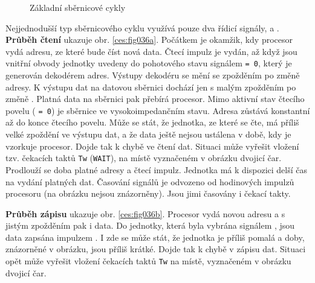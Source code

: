       \begin{figure}[ht!] 
        \centering  
        \hspace{1em}
        \caption{Základní sběrnicové cykly}
        \label{ces:fig036}
      \end{figure}
    
      Nejjednodušší typ sběrnicového cyklu využívá pouze dva řídicí signály,
       a . \textbf{Průběh čtení} ukazuje obr.
      \ref{ces:fig036a}. Počátkem je okamžik, kdy procesor vydá adresu, ze které bude číst nová
      data. Čtecí impulz  je vydán, až když jsou vnitřní obvody jednotky
      uvedeny do pohotového stavu signálem   \texttt{= 0}, který je
      generován dekodérem adres. Výstupy dekodéru se mění se zpožděním po změně adresy. K výstupu
      dat na datovou sběrnici dochází jen s malým zpožděním po změně .
      Platná data na sběrnici pak přebírá procesor. Mimo aktivní stav čtecího povelu
      ( \texttt{= 0}) je sběrnice ve vysokoimpedančním stavu. Adresa
      zůstává konstantní až do konce čtecího povelu. Může se stát, že jednotka, ze které se čte, má
      příliš velké zpoždění ve výstupu dat, a že data ještě nejsou ustálena v době, kdy je vzorkuje
      procesor. Dojde tak k chybě ve čtení dat. Situaci může vyřešit vložení tzv. čekacích taktů
      \texttt{Tw} (\texttt{WAIT}), na místě vyznačeném v obrázku dvojicí čar. Prodlouží se doba
      platné adresy a čtecí impulz. Jednotka má k dispozici delší čas na vydání platných dat.
      Časování signálů je odvozeno od hodinových impulzů procesoru (na obrázku nejsou znázorněny).
      Jsou jimi časovány i čekací takty.
      
      \textbf{Průběh zápisu} ukazuje obr. \ref{ces:fig036b}. Procesor vydá novou adresu a s 
      jistým zpožděním pak i data. Do jednotky, která byla vybrána signálem  
      , jsou data zapsána impulzem . I zde se 
      může stát, že jednotka je příliš pomalá a doby, znázorněné v obrázku, jsou příliš krátké. 
      Dojde tak k chybě v zápisu dat. Situaci opět může vyřešit vložení čekacích taktů \texttt{Tw} 
      na místě, vyznačeném v obrázku dvojicí čar.
     
